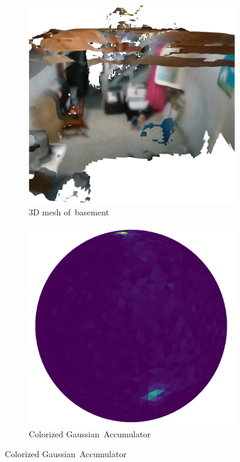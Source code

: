 \begin{figure}[H]
\centering
 \captionsetup[subfigure]{justification=centering}
  \begin{subfigure}[t]{.35\linewidth}
    \centering\includegraphics[clip,trim=0.1cm 0cm 0.99cm 0.6cm, width=.80\linewidth]{chapter_3_polylidar3d/imgs/basement_mesh_v2.pdf}
    \caption{3D mesh of~basement\label{fig:ch3_basement_mesh}}
  \end{subfigure}
  \hfill
  \begin{subfigure}[t]{.35\linewidth}
    \centering\includegraphics[clip,trim=0.1cm 0cm 0.99cm 0.40cm,width=.80\linewidth]{chapter_3_polylidar3d/imgs/basement_ga.pdf}
    \caption{Colorized Gaussian~Accumulator\label{fig:ch3_basement_ga}}

\end{subfigure}
\end{figure}
